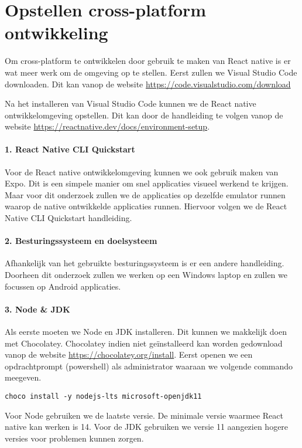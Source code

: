 \section{Opstellen cross-platform ontwikkeling}
Om cross-platform te ontwikkelen door gebruik te maken van React native is er wat meer werk om 
de omgeving op te stellen. Eerst zullen we Visual Studio Code downloaden. 
Dit kan vanop de website \url{https://code.visualstudio.com/download} 

Na het installeren van Visual Studio Code kunnen we de React native ontwikkelomgeving opstellen. 
Dit kan door de handleiding te volgen vanop de website \url{https://reactnative.dev/docs/environment-setup}.

\paragraph{1. React Native CLI Quickstart}
Voor de React native ontwikkelomgeving kunnen we ook gebruik maken van Expo. 
Dit is een simpele manier om snel applicaties visueel werkend te krijgen. 
Maar voor dit onderzoek zullen we de applicaties op dezelfde emulator runnen waarop de native 
ontwikkelde applicaties runnen. Hiervoor volgen we de React Native CLI Quickstart handleiding. 

\paragraph{2. Besturingssysteem en doelsysteem}
Afhankelijk van het gebruikte besturingssysteem is er een andere handleiding. 
Doorheen dit onderzoek zullen we werken op een Windows laptop en zullen we focussen op Android applicaties.

\paragraph{3. Node \& JDK}
Als eerste moeten we \gls{Node} en \gls{JDK} installeren. Dit kunnen we makkelijk 
doen met \gls{Chocolatey}. Chocolatey indien niet geïnstalleerd kan worden gedownload 
vanop de website \url{https://chocolatey.org/install}. Eerst openen we een 
opdrachtprompt (powershell) als administrator waaraan we volgende commando meegeven.
\begin{verbatim}
choco install -y nodejs-lts microsoft-openjdk11
\end{verbatim}
Voor Node gebruiken we de laatste versie. De minimale versie waarmee React native kan werken is 14. 
Voor de JDK gebruiken we versie 11 aangezien hogere versies voor problemen kunnen zorgen.

